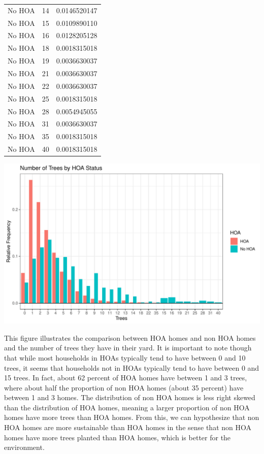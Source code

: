 \documentclass{article}
\begin{document}
\begin{table}[p]
\begin{tabular}{lll}
No HOA     & 14    & 0.0146520147 \\
No HOA     & 15    & 0.0109890110 \\
No HOA     & 16    & 0.0128205128 \\
No HOA     & 18    & 0.0018315018 \\
No HOA     & 19    & 0.0036630037 \\
No HOA     & 21    & 0.0036630037 \\
No HOA     & 22    & 0.0036630037 \\
No HOA     & 25    & 0.0018315018 \\
No HOA     & 28    & 0.0054945055 \\
No HOA     & 31    & 0.0036630037 \\
No HOA     & 35    & 0.0018315018 \\
No HOA     & 40    & 0.0018315018
\end{tabular}
\end{table}
\includegraphics{exam1-010}

This figure illustrates the comparison between HOA homes and non HOA homes and the number of trees they have in their yard. It is important to note though that while most households in HOAs typically tend to have between 0 and 10 trees, it seems that households not in HOAs typically tend to have between 0 and 15 trees. In fact, about 62 percent of HOA homes have between 1 and 3 trees, where about half the proportion of non HOA homes (about 35 percent) have between 1 and 3 homes. The distribution of non HOA homes is less right skewed than the distribution of HOA homes, meaning a larger proportion of non HOA homes have more trees than HOA homes. From this, we can hypothesize that non HOA homes are more sustainable than HOA homes in the sense that non HOA homes have more trees planted than HOA homes, which is better for the environment.
\end{document}
